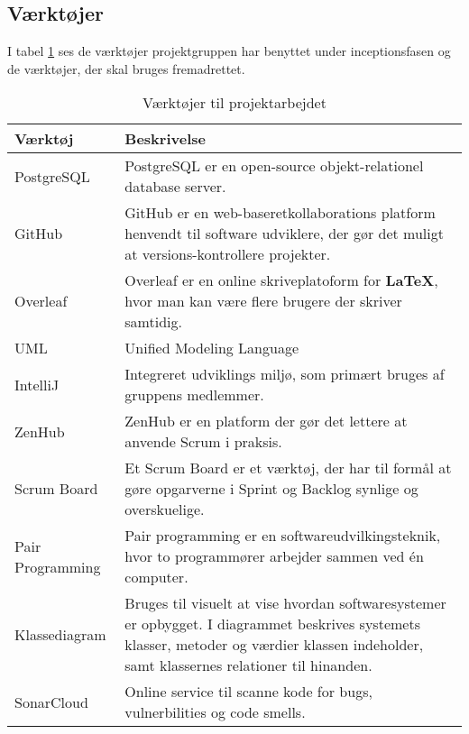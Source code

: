 \subsection{Værktøjer}
I tabel \ref{tab:tools} ses de værktøjer projektgruppen har benyttet under inceptionsfasen og de værktøjer, der skal bruges fremadrettet.
\begin{table}[ht]
    \begin{tabularx}{\textwidth}{|p{4cm}|X|}
        \hline
        \textbf{Værktøj} & \textbf{Beskrivelse} \\
        \hline
        PostgreSQL          &   PostgreSQL er en open-source objekt-relationel database server.\\
        \hline
        GitHub              &   GitHub er en web-baseretkollaborations platform henvendt til software udviklere, der gør det muligt at versions-kontrollere projekter.\\ 
        \hline
        Overleaf            &   Overleaf er en online skriveplatoform for \textbf{LaTeX}, hvor man kan være flere brugere der skriver samtidig. \\
        \hline
        UML                 &   Unified Modeling Language \\
        \hline
        IntelliJ            &   Integreret udviklings miljø, som primært bruges af gruppens medlemmer. \\
        \hline
        ZenHub              &   ZenHub er en platform der gør det lettere at anvende Scrum i praksis.  \\
        \hline
        Scrum Board         &   Et Scrum Board er et værktøj, der har til formål at gøre opgarverne i Sprint og Backlog synlige og overskuelige.\\
        \hline
        Pair Programming    &   Pair programming er en softwareudvilkingsteknik, hvor to programmører arbejder sammen ved én computer.\\
        \hline
        Klassediagram       &   Bruges til visuelt at vise hvordan softwaresystemer er opbygget. I diagrammet beskrives systemets klasser, metoder og værdier klassen indeholder, samt klassernes relationer til hinanden.\\
        \hline
        SonarCloud          &   Online service til scanne kode for bugs, vulnerbilities og code smells.\\
        \hline
    \end{tabularx}
    \caption{Værktøjer til projektarbejdet}
    \label{tab:tools}
\end{table}